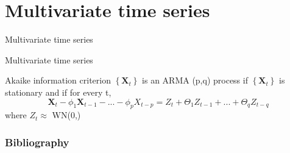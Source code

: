 \documentclass[11pt]{beamer}
\begin{document}
\section{Multivariate time series}
\begin{frame}
\begin{center}
\Huge
Multivariate time series
\end{center}
\end{frame}

\begin{frame}{Multivariate time series \cite{brockwell2002introduction}}
\begin{alertblock}{Akaike information criterion}
$\left\lbrace \textbf{X}_{t} \right\rbrace$ is an ARMA (p,q) process if $\left\lbrace \textbf{X}_{t} \right\rbrace$ is stationary and if for every t, 
\begin{equation*}
\bm{X}_{t}-\phi_{1}\bm{X}_{t-1}-...-\phi_{p}X_{t-p}=Z_{t}+\Theta_{1}Z_{t-1}+...+\Theta_{q}Z_{t-q}
\end{equation*}
where $Z_{t}\approx$ WN(0,\Sigma)
\end{alertblock}
\end{frame}


\begin{frame}
\frametitle{Bibliography}
\printbibliography
\end{frame}
\end{document}
